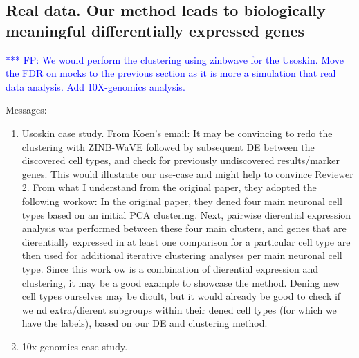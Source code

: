 \documentclass{bmcart}
\newcommand{\fanny}[1]{\textcolor{blue}{*** FP: #1}}
\begin{document}
\subsection*{Real data. Our method leads to biologically meaningful differentially expressed genes}

\fanny{We would perform the clustering using zinbwave for the Usoskin. Move the FDR on mocks to the previous section as it is more a simulation that real data analysis. Add 10X-genomics analysis.}

{\color{blue} Messages:
\begin{enumerate}
\item Usoskin case study. From Koen's email: It may be convincing to redo the clustering with ZINB-WaVE followed by subsequent DE between the discovered cell types, and check for previously undiscovered results/marker genes. This would illustrate our use-case and might help to convince Reviewer 2. From what I understand from the original paper, they adopted the following workow: In the original paper, they dened four main neuronal cell types based on an initial PCA clustering. Next, pairwise dierential expression analysis was performed between these four main clusters, and genes that are dierentially expressed in at least one comparison for a particular cell type are then used for additional iterative clustering analyses per main neuronal cell type. Since this work ow is a combination of dierential expression and clustering, it may be a good example to showcase the method. Dening new cell types ourselves may be dicult, but it would already be good to check if we nd extra/dierent subgroups within their dened cell types (for which we have the labels), based on our DE and clustering method.
\item 10x-genomics case study.
\end{enumerate}
}
\end{document}
